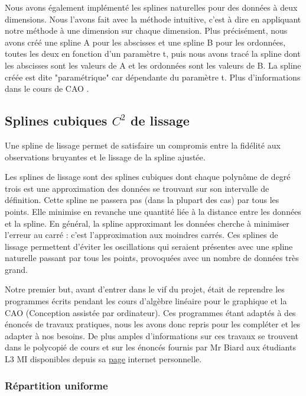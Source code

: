 \documentclass[a4paper,12pt]{article} %
\begin{document}
            Nous avons également implémenté les splines naturelles pour des données à deux dimensions. Nous l'avons fait avec la méthode intuitive, c'est à dire en appliquant notre méthode à une dimension sur chaque dimension. Plus précisément, nous avons créé une spline A pour les abscisses et une spline B pour les ordonnées, toutes les deux en fonction d'un paramètre t, puis nous avons tracé la spline dont les abscisses sont les valeurs de A et les ordonnées sont les valeurs de B. La spline créée est dite "paramétrique" car dépendante du paramètre t. Plus d'informations dans le cours de CAO \cite{CAO_lissage}.
            
		\subsection{\label{partie_lissage}Splines cubiques $C^2$ de lissage}
		
		    Une spline de lissage permet de satisfaire un compromis entre la fidélité aux observations bruyantes et le lissage de la spline ajustée.
		
		    Les splines de lissage sont des splines cubiques dont chaque polynôme de degré trois est une approximation des données se trouvant sur son intervalle de définition. Cette spline ne passera pas (dans la plupart des cas)  par tous les points. Elle  minimise en revanche une quantité liée à la distance entre les données et la spline. En général, la spline approximant les données cherche à minimiser l'erreur au carré : c'est l'approximation aux moindres carrés.  Ces splines de lissage permettent d'éviter les oscillations qui seraient présentes avec une spline naturelle passant par tous les points, provoquées avec un nombre de données très grand. 
		    
		    Notre premier but, avant d'entrer dans le vif du projet, était de reprendre les programmes écrits pendant les cours d'algèbre linéaire pour le graphique et la CAO (Conception assistée par ordinateur). Ces programmes étant adaptés à des énoncés de travaux pratiques, nous les avons donc repris pour les compléter et les adapter à nos besoins.  De plus amples d'informations sur ces travaux se trouvent dans le polycopié de cours et sur les énoncés fournis par Mr Biard aux étudiants L3 MI disponibles depuis sa \href{http://www-ljk.imag.fr/membres/Luc.Biard}{page} internet personnelle.
	        

			\subsubsection{Répartition uniforme}
			
\end{document}
